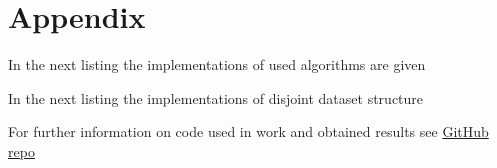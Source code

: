 \section*{Appendix}

In the next listing the implementations of used algorithms are given



In the next listing the implementations of disjoint dataset structure



For further information on code used in work and obtained results see \href{https://github.com/RyazMax/ITMO_Algorithms/tree/main/LR8}{GitHub repo}